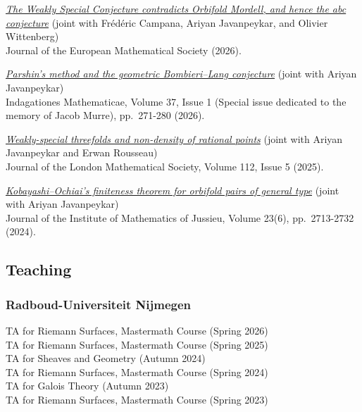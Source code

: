 \documentclass[paper=a4,fontsize=10pt,DIV=12,BCOR=3mm,pdftex]{scrartcl}
\begin{document}
\begin{etaremune}
\item \href{https://doi.org/10.4171/jems/1772}{\textit{The Weakly Special Conjecture contradicts Orbifold Mordell, and hence the abc conjecture}} (joint with Frédéric Campana, Ariyan Javanpeykar, and Olivier Wittenberg) \\
Journal of the European Mathematical Society (2026).

\item \href{https://doi.org/10.1016/j.indag.2024.10.005}{\textit{Parshin's method and the geometric Bombieri--Lang conjecture}} (joint with Ariyan Javanpeykar) \\
Indagationes Mathematicae, Volume 37, Issue 1 (Special issue dedicated to the memory of Jacob Murre), pp.\ 271-280 (2026).

\item \href{https://doi.org/10.1112/jlms.70348}{\textit{Weakly-special threefolds and non-density of rational points}} (joint with Ariyan Javanpeykar and Erwan Rousseau) \\
Journal of the London Mathematical Society, Volume 112, Issue 5 (2025).

\item \href{https://doi.org/10.1017/S1474748024000094}{\textit{Kobayashi--Ochiai's finiteness theorem for orbifold pairs of general type}} (joint with Ariyan Javanpeykar) \\
Journal of the Institute of Mathematics of Jussieu, Volume 23(6), pp.\ 2713-2732 (2024).
\end{etaremune}


\subsection*{Teaching}

\subsubsection*{Radboud-Universiteit Nijmegen}
TA for Riemann Surfaces, Mastermath Course (Spring 2026) \\
TA for Riemann Surfaces, Mastermath Course (Spring 2025) \\
TA for Sheaves and Geometry (Autumn 2024) \\
TA for Riemann Surfaces, Mastermath Course (Spring 2024) \\
TA for Galois Theory (Autumn 2023) \\
TA for Riemann Surfaces, Mastermath Course (Spring 2023)
\end{document}
